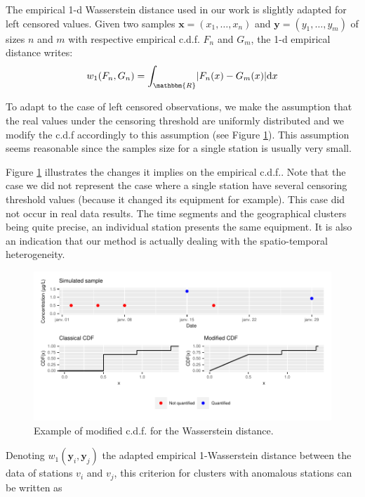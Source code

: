 The empirical 1-d Wasserstein distance used in our work is slightly adapted for left censored values. Given two samples $\bm{x}=(x_1,\dots,x_n)$ and $\bm{y}=(y_1,\dots,y_m)$ of sizes $n$ and $m$ with respective empirical c.d.f. $F_n$ and $G_m$, the 1-d empirical distance writes:
\begin{equation}\label{chp:5:wassdiss}
w_1(F_n,G_n) = \int_{\mathbbm{R}}\lvert F_n(x)-G_m(x) \rvert\mathrm{d}x
\end{equation}

To adapt to the case of left censored observations, we make the assumption that the real values under the censoring threshold are uniformly distributed and we modify the c.d.f accordingly to this assumption (see Figure \ref{fig:mod_dist}). This assumption seems reasonable since  the samples size for a single station is usually very small. 

Figure \ref{fig:mod_dist} illustrates the changes it implies on the empirical c.d.f.. Note that the case we did not represent the case where a single station have several censoring threshold values (because it changed its equipment for example). This case did not occur in real data results. The time segments and the geographical clusters being quite precise, an individual station presents the same equipment. It is also an indication that our method is actually dealing with the spatio-temporal heterogeneity.    

\begin{figure}[htbp]
    \centering
    \includegraphics{figs/App/Wass_ew.pdf}
    \caption{Example of modified c.d.f. for the Wasserstein distance.}
    \label{fig:mod_dist}
\end{figure}

Denoting $w_1(\mathbf{y}_i,\mathbf{y}_j)$ the adapted empirical 1-Wasserstein distance between the data of stations $v_i$ and $v_j$, this criterion for clusters with anomalous stations can be written as   

